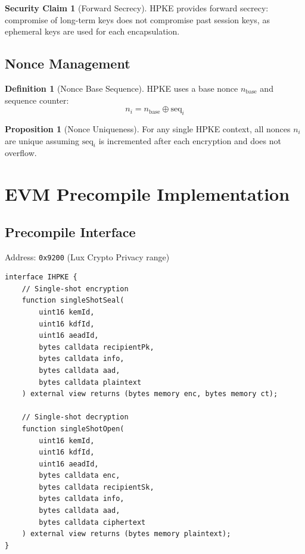 \documentclass[11pt,a4paper]{article}
\theoremstyle{definition}
\newtheorem{definition}{Definition}
\newtheorem{proposition}{Proposition}
\newtheorem{security}{Security Claim}
\begin{document}
\begin{security}[Forward Secrecy]
HPKE provides forward secrecy: compromise of long-term keys does not compromise past session keys, as ephemeral keys are used for each encapsulation.
\end{security}

\subsection{Nonce Management}

\begin{definition}[Nonce Base Sequence]
HPKE uses a base nonce $n_{\text{base}}$ and sequence counter:
\[
n_i = n_{\text{base}} \oplus \text{seq}_i
\]
\end{definition}

\begin{proposition}[Nonce Uniqueness]
For any single HPKE context, all nonces $n_i$ are unique assuming $\text{seq}_i$ is incremented after each encryption and does not overflow.
\end{proposition}

\section{EVM Precompile Implementation}

\subsection{Precompile Interface}

Address: \texttt{0x9200} (Lux Crypto Privacy range)

\begin{lstlisting}[language=Solidity]
interface IHPKE {
    // Single-shot encryption
    function singleShotSeal(
        uint16 kemId,
        uint16 kdfId,
        uint16 aeadId,
        bytes calldata recipientPk,
        bytes calldata info,
        bytes calldata aad,
        bytes calldata plaintext
    ) external view returns (bytes memory enc, bytes memory ct);

    // Single-shot decryption
    function singleShotOpen(
        uint16 kemId,
        uint16 kdfId,
        uint16 aeadId,
        bytes calldata enc,
        bytes calldata recipientSk,
        bytes calldata info,
        bytes calldata aad,
        bytes calldata ciphertext
    ) external view returns (bytes memory plaintext);
}
\end{lstlisting}
\end{document}
